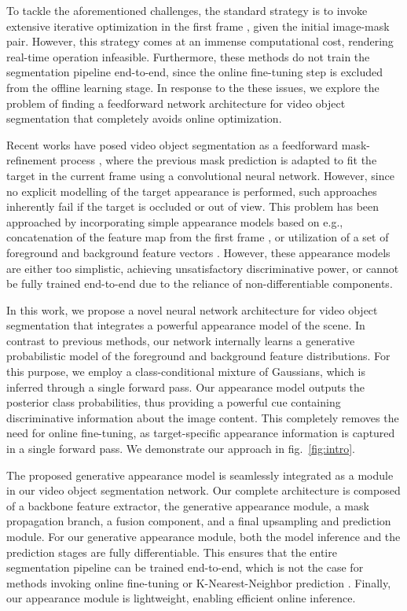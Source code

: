 \documentclass[10pt,twocolumn,letterpaper]{article}
\begin{document}
To tackle the aforementioned challenges, the standard strategy is to invoke extensive iterative optimization in the first frame \cite{OSVOS,OnAVOS,OSVOS-S,CINM}, given the initial image-mask pair. However, this strategy comes at an immense computational cost, rendering real-time operation infeasible. Furthermore, these methods do not train the segmentation pipeline end-to-end, since the online fine-tuning step is excluded from the offline learning stage. In response to the these issues, we explore the problem of finding a feedforward network architecture for video object segmentation that completely avoids online optimization. 

Recent works have posed video object segmentation as a feedforward mask-refinement process \cite{MSK,OSMN,RGMP}, where the previous mask prediction is adapted to fit the target in the current frame using a convolutional neural network. However, since no explicit modelling of the target appearance is performed, such approaches inherently fail if the target is occluded or out of view. This problem has been approached by incorporating simple appearance models based on e.g., concatenation of the feature map from the first frame \cite{RGMP}, or utilization of a set of foreground and background feature vectors \cite{VM,PML}. However, these appearance models are either too simplistic, achieving unsatisfactory discriminative power, or cannot be fully trained end-to-end due to the reliance of non-differentiable components. 

In this work, we propose a novel neural network architecture for video object segmentation that integrates a powerful appearance model of the scene. In contrast to previous methods, our network internally learns a generative probabilistic model of the foreground and background feature distributions. For this purpose, we employ a class-conditional mixture of Gaussians, which is inferred through a single forward pass. Our appearance model outputs the posterior class probabilities, thus providing a powerful cue containing discriminative information about the image content. This completely removes the need for online fine-tuning, as target-specific appearance information is captured in a single forward pass. We demonstrate our approach in fig.~\ref{fig:intro}.

The proposed generative appearance model is seamlessly integrated as a module in our video object segmentation network. Our complete architecture is composed of a backbone feature extractor, the generative appearance module, a mask propagation branch, a fusion component, and a final upsampling and prediction module. For our generative appearance module, both the model inference and the prediction stages are fully differentiable. This ensures that the entire segmentation pipeline can be trained end-to-end, which is not the case for methods invoking online fine-tuning \cite{OSVOS,OSVOS-S,OnAVOS,CINM,MSK,MGCRN} or K-Nearest-Neighbor prediction \cite{VM,PML}. Finally, our appearance module is lightweight, enabling efficient online inference. 
\end{document}

